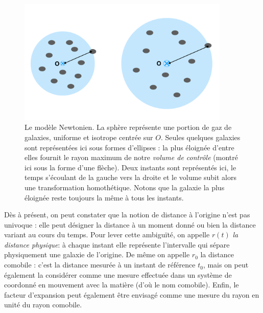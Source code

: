 \begin{figure}[htbp]
	\centering
		\includegraphics[height=6cm]{figs/newton.png}
	\caption[le modèle cosmologique Newtonien]{Le modèle Newtonien. La sphère représente une portion de gaz de galaxies, uniforme et isotrope centrée sur $O$. Seules quelques galaxies sont représentées ici sous formes d'ellipses : la plus éloignée d'entre elles fournit le rayon maximum de notre \textit{volume de contrôle} (montré ici sous la forme d'une flèche). Deux instants sont représentés ici, le temps s'écoulant de la gauche vers la droite et le volume subit alors une transformation homothétique. Notons que la galaxie la plus éloignée reste toujours la même à tous les instants.}
	\label{f:newton}
\end{figure}

Dès à présent, on peut constater que la notion de distance à l'origine n'est pas univoque : elle peut désigner la distance à un moment donné ou bien la distance variant au cours du temps. Pour lever cette ambiguïté, on appelle $r(t)$ \textit{la distance physique}: à chaque instant elle représente l'intervalle qui sépare physiquement une galaxie de l'origine. De même on appelle $r_0$ la distance  comobile : c'est la distance mesurée à un instant de référence $t_0$, mais on peut également la considérer comme une mesure effectuée dans un système de coordonné en mouvement avec la matière (d'où le nom comobile). Enfin, le facteur d'expansion peut également être envisagé comme une mesure du rayon en unité du rayon comobile.


